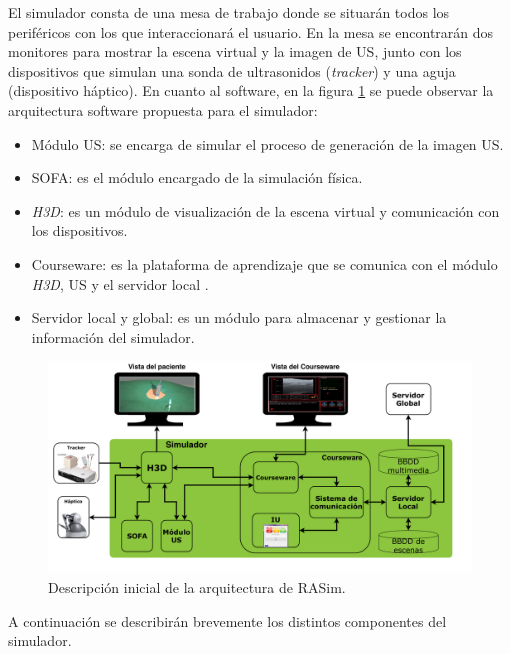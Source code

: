 El simulador consta de una mesa de trabajo donde se situarán todos los periféricos con los que interaccionará el usuario. En la mesa se encontrarán dos monitores para mostrar la escena virtual y la imagen de \ac{US}, junto con los dispositivos que simulan una sonda de ultrasonidos (\emph{\acs{tracker}}) y una aguja (dispositivo háptico). En cuanto al software, en la figura \ref{fig:coursearq} se puede observar la arquitectura software propuesta para el simulador: 
\begin{itemize}

    \item Módulo US: se encarga de simular el proceso de generación de la imagen \ac{US}.
    \item \acs{SOFA}: es el módulo encargado de la simulación física.
    \item \emph{H3D}: es un módulo de visualización de la escena virtual y comunicación con los dispositivos.
    \item \acs{Courseware}: es la plataforma de aprendizaje que se comunica con el módulo \emph{H3D}, \ac{US} y el servidor local .
    \item Servidor local y global: es un módulo para almacenar y gestionar la información del simulador.
\end{itemize}

\begin{figure}[ht]
    \centering
    \includegraphics[width=\textwidth]{IMG/RasimArq.pdf}
    \caption{Descripción inicial de la arquitectura de \acs{RASim}.}
    \label{fig:coursearq}
\end{figure}


A continuación se describirán brevemente los distintos componentes del simulador.




